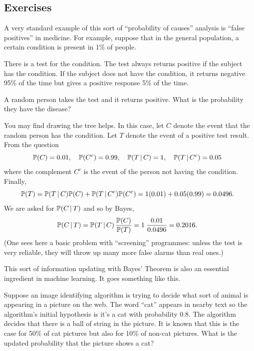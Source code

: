 \subsection{Exercises} 


\begin{exer}
A very standard example of this sort of ``probability of causes'' analysis is ``false positives'' in medicine. For example, suppose that in the general population, a certain condition is present in 1\% of people.  

There is a test for the condition. The test always returns positive if the subject has the condition.  If the subject does not have the condition, it returns negative 95\% of the time but gives a positive response 5\% of the time.  

A random person takes the test and it returns positive. What is the probability they have the disease? 
\end{exer}

\begin{sol}
You may find drawing the tree helps.   In this case, let $C$ denote the event that the random person has the condition.  Let $T$ denote the event of a positive test result.  From the question 
 \[  
    {\mathbb P}(C) = 0.01, \quad {\mathbb P}(C^c) = 0.99, \quad {\mathbb P}(T \, | \, C) = 1, 
    \quad {\mathbb P}( T \, | \, C^c)=0.05
 \] 
 where the complement $C^c$ is the event of the person not having the condition. Finally, 
 \[
 {\mathbb P}(T) = {\mathbb P}(T \, | \, C) {\mathbb P}(C) + {\mathbb P}(T \, | \, C^c) {\mathbb P}(C^c) = 
   1 (0.01) + 0.05 ( 0.99) = 0.0496.
 \]
We are asked for ${\mathbb P}( C \, | \, T)$ and so by Bayes,
\[
   {\mathbb P}(C \, | \, T) = {\mathbb P}(T \, | \, C) \,\frac{{\mathbb P}(C)}{{\mathbb P}(T)} 
   = 1 \; \frac{0.01}{0.0496} = 0.2016. 
\]
(One sees here a basic problem with ``screening'' programmes: unless the test is very reliable, they will throw up many more false alarms than real ones.) 
\end{sol}

\begin{exer}
This sort of information updating with Bayes' Theorem is also an essential ingredient in machine learning. It goes something like this. 

Suppose an image identifying algorithm is trying to decide what sort of animal is appearing in a picture on the web.  The word ``cat'' appears in nearby text so the algorithm's initial hypothesis is it's a cat with probability $0.8$. The algorithm decides that there is a ball of string in the picture. It is known that this is the case for 50\% of cat pictures but also for 10\% of non-cat pictures.  What is the updated probability that the picture shows a cat? 
\end{exer}

